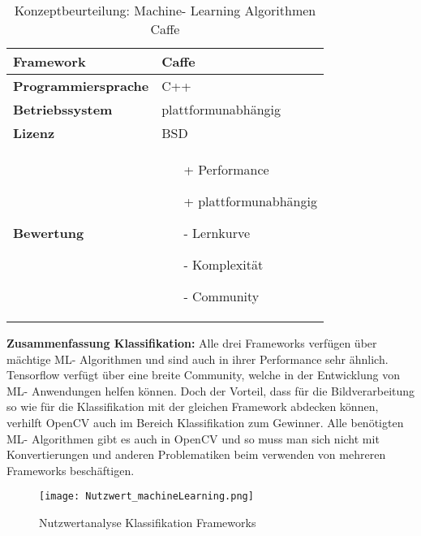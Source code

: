 \documentclass[../../main.tex]{subfiles}
\begin{document}
        \begin{flushleft}
            \begin{table}[h]
            \begin{tabular}{ | l | p{11cm} |}
            \hline
            \textbf{Framework} & Caffe \\ \hline
            \textbf{Programmiersprache} & C++ \\ \hline
            \textbf{Betriebssystem} & plattformunabhängig \\ \hline
            \textbf{Lizenz} & BSD \\ \hline
            \textbf{Bewertung} &  \begin{itemize}
                                    \item[+] Performance
                                    \item[+] plattformunabhängig 
                                    \item[-] Lernkurve
                                    \item[-] Komplexität 
                                    \item[-] Community 
                                  \end{itemize} \\ \hline
            \end{tabular}
            \caption{Konzeptbeurteilung: Machine- Learning Algorithmen Caffe}
            \label{tab:konzept_ML_Caffe}
            \end{table}
        \end{flushleft}

        \vspace{1cm}

        \textbf{Zusammenfassung Klassifikation: }
        Alle drei Frameworks verfügen über mächtige ML- Algorithmen und sind auch in ihrer Performance sehr ähnlich. Tensorflow verfügt über eine breite Community, welche in der Entwicklung von ML- Anwendungen helfen können. Doch der Vorteil, dass für die Bildverarbeitung so wie für die Klassifikation mit der gleichen Framework abdecken können, verhilft OpenCV auch im Bereich Klassifikation zum Gewinner. Alle benötigten ML- Algorithmen gibt es auch in OpenCV und so muss man sich nicht mit Konvertierungen und anderen Problematiken beim verwenden von mehreren Frameworks beschäftigen.


        \begin{figure}[H] 
            \centering
            \texttt{[image: Nutzwert\_machineLearning.png]}
            \caption{Nutzwertanalyse Klassifikation Frameworks}
            \label{fig:ML_nutzwert}
        \end{figure}



        
    
    
    
    
    
\end{document}
